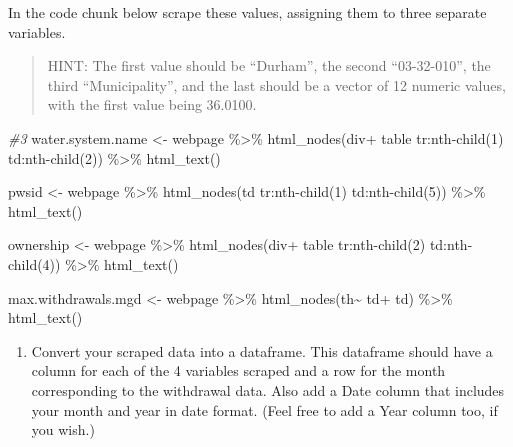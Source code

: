 \documentclass[
]{article}
\newenvironment{Shaded}{\begin{snugshade}}{\end{snugshade}}
\newcommand{\CommentTok}[1]{\textcolor[rgb]{0.56,0.35,0.01}{\textit{#1}}}
\newcommand{\FunctionTok}[1]{\textcolor[rgb]{0.00,0.00,0.00}{#1}}
\newcommand{\NormalTok}[1]{#1}
\newcommand{\OtherTok}[1]{\textcolor[rgb]{0.56,0.35,0.01}{#1}}
\newcommand{\SpecialCharTok}[1]{\textcolor[rgb]{0.00,0.00,0.00}{#1}}
\newcommand{\StringTok}[1]{\textcolor[rgb]{0.31,0.60,0.02}{#1}}
\providecommand{\tightlist}{%
  \setlength{\itemsep}{0pt}\setlength{\parskip}{0pt}}
\begin{document}
In the code chunk below scrape these values, assigning them to three
separate variables.

\begin{quote}
HINT: The first value should be ``Durham'', the second ``03-32-010'',
the third ``Municipality'', and the last should be a vector of 12
numeric values, with the first value being 36.0100.
\end{quote}

\begin{Shaded}
\begin{Highlighting}[]
\CommentTok{\#3}
\NormalTok{water.system.name }\OtherTok{\textless{}{-}}\NormalTok{ webpage }\SpecialCharTok{\%\textgreater{}\%} \FunctionTok{html\_nodes}\NormalTok{(}\StringTok{\textquotesingle{}div+ table tr:nth{-}child(1) td:nth{-}child(2)\textquotesingle{}}\NormalTok{) }\SpecialCharTok{\%\textgreater{}\%} \FunctionTok{html\_text}\NormalTok{()}

\NormalTok{pwsid }\OtherTok{\textless{}{-}}\NormalTok{ webpage }\SpecialCharTok{\%\textgreater{}\%} \FunctionTok{html\_nodes}\NormalTok{(}\StringTok{\textquotesingle{}td tr:nth{-}child(1) td:nth{-}child(5)\textquotesingle{}}\NormalTok{) }\SpecialCharTok{\%\textgreater{}\%} \FunctionTok{html\_text}\NormalTok{()}

\NormalTok{ownership }\OtherTok{\textless{}{-}}\NormalTok{ webpage }\SpecialCharTok{\%\textgreater{}\%} \FunctionTok{html\_nodes}\NormalTok{(}\StringTok{\textquotesingle{}div+ table tr:nth{-}child(2) td:nth{-}child(4)\textquotesingle{}}\NormalTok{) }\SpecialCharTok{\%\textgreater{}\%} \FunctionTok{html\_text}\NormalTok{()}

\NormalTok{max.withdrawals.mgd }\OtherTok{\textless{}{-}}\NormalTok{ webpage }\SpecialCharTok{\%\textgreater{}\%} \FunctionTok{html\_nodes}\NormalTok{(}\StringTok{\textquotesingle{}th\textasciitilde{} td+ td\textquotesingle{}}\NormalTok{) }\SpecialCharTok{\%\textgreater{}\%} \FunctionTok{html\_text}\NormalTok{()}
\end{Highlighting}
\end{Shaded}

\begin{enumerate}
\def\labelenumi{\arabic{enumi}.}
\setcounter{enumi}{3}
\tightlist
\item
  Convert your scraped data into a dataframe. This dataframe should have
  a column for each of the 4 variables scraped and a row for the month
  corresponding to the withdrawal data. Also add a Date column that
  includes your month and year in date format. (Feel free to add a Year
  column too, if you wish.)
\end{enumerate}
\end{document}
